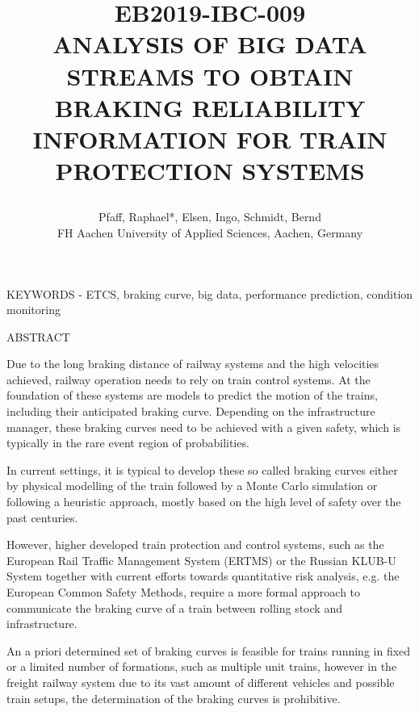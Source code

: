 \documentclass[a4paper, 12pt]{scrartcl}
\begin{document}
\setlength{\parindent}{0ex}
\title{
	\begin{flushleft}
	{\normalsize\textbf{EB2019-IBC-009}
	}\\ \vspace{.5cm}
	\large \uppercase{Analysis of Big Data Streams to obtain Braking Reliability Information for Train Protection systems}
	\end{flushleft}
	}

\author{\normalsize	
	Pfaff, Raphael*, Elsen, Ingo, Schmidt, Bernd \\ \normalsize	
	FH Aachen University of Applied Sciences, Aachen, Germany %
	}
\date{}
\maketitle


KEYWORDS - ETCS, braking curve, big data, performance prediction, condition monitoring
\vspace{.2cm}

ABSTRACT 

Due to the long braking distance of railway systems and the high velocities achieved, railway operation needs to rely on train control systems. At the foundation of these systems are models to predict the motion of the trains, including their anticipated braking curve. Depending on the infrastructure manager, these braking curves need to be achieved with a given safety, which is typically in the rare event region of probabilities.

In current settings, it is typical to develop these so called braking curves either by physical modelling of the train followed by a Monte Carlo simulation or following a heuristic approach, mostly based on the high level of safety over the past centuries.

However, higher developed train protection and control systems, such as the European Rail Traffic Management System (ERTMS) or the Russian KLUB-U System together with current efforts towards quantitative risk analysis, e.g. the European Common Safety Methods, require a more formal approach to communicate the braking curve of a train between rolling stock and infrastructure.

An a priori determined set of braking curves is feasible for trains running in fixed or a limited number of formations, such as multiple unit trains, however in the freight railway system due to its vast amount of different vehicles and possible train setups, the determination of the braking curves is prohibitive.
\end{document}
